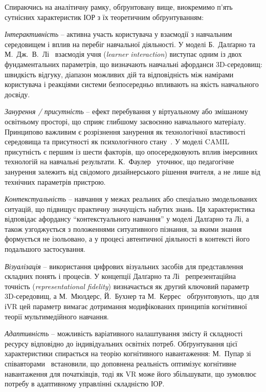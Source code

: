Спираючись на аналітичну рамку, обґрунтовану вище, виокремимо п'ять сутнісних характеристик ІОР з їх теоретичним обґрунтуванням:

\emph{Інтерактивність} -- активна участь користувача у взаємодії з навчальним середовищем і вплив на перебіг навчальної діяльності. У моделі Б.~Далґарно та М.~Дж.~В.~Лі~\cite{Dalgarno2010What} взаємодія учня (\emph{learner interaction}) виступає одним із двох фундаментальних параметрів, що визначають навчальні афорданси 3D-середовищ: швидкість відгуку, діапазон можливих дій та відповідність між намірами користувача і реакціями системи безпосередньо впливають на якість навчального досвіду.

\emph{Занурення / присутність} -- ефект перебування у віртуальному або змішаному освітньому просторі, що сприяє глибшому засвоєнню навчального матеріалу. Принципово важливим є розрізнення занурення як технологічної властивості середовища та присутності як психологічного стану~\cite{Semerikov2023Presence}. У моделі CAMIL~\cite{Makransky2021CAMIL} присутність є першим із шести факторів, що опосередковують вплив імерсивних технологій на навчальні результати. К.~Фаулер~\cite{Fowler2015Pedagogy} уточнює, що педагогічне занурення залежить від свідомого дизайнерського рішення вчителя, а не лише від технічних параметрів пристрою.

\emph{Контекстуальність} -- навчання у межах реальних або спеціально змодельованих ситуацій, що підвищує практичну значущість набутих знань. Ця характеристика відповідає афордансу ``контекстуального навчання'' у моделі Далґарно та Лі, а також узгоджується з положеннями ситуативного пізнання, за якими знання формується не ізольовано, а у процесі автентичної діяльності в контексті його подальшого застосування.

\emph{Візуалізація} -- використання цифрових візуальних засобів для представлення складних понять і процесів. У концепції Далґарно та Лі~\cite{Dalgarno2010What} репрезентаційна точність (\emph{representational fidelity}) визначається як другий ключовий параметр 3D-середовищ, а М.~Мюлдерс, Й.~Бухнер та М.~Керрес~\cite{Mulders2020Framework} обґрунтовують, що для іVR цей параметр вимагає дотримання модифікованих принципів когнітивної теорії мультимедійного навчання.

\emph{Адаптивність} -- можливість варіативного налаштування змісту й складності ресурсу відповідно до індивідуальних освітніх потреб. Обґрунтування цієї характеристики спирається на теорію когнітивного навантаження: М.~Пупар зі співавторами~\cite{Poupard2024Systematic} встановили, що доповнена реальність оптимізує когнітивне навантаження для початківців, тоді як VR може його збільшувати, що зумовлює потребу в адаптивному управлінні складністю ІОР.

